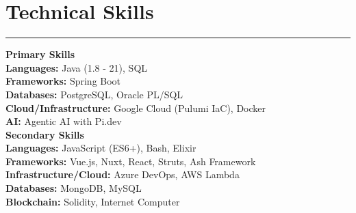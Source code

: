 \documentclass[11pt,a4paper]{article}
\begin{document}
\section*{Technical Skills}
\hrule
\vspace{5pt}
\textbf{Primary Skills} \\[6pt]
\textbf{Languages:} Java (1.8 - 21), SQL \\
\textbf{Frameworks:} Spring Boot \\
\textbf{Databases:} PostgreSQL, Oracle PL/SQL \\
\textbf{Cloud/Infrastructure:} Google Cloud (Pulumi IaC), Docker \\
\textbf{AI:} Agentic AI with Pi.dev \\[6pt]
\textbf{Secondary Skills} \\[6pt]
\textbf{Languages:} JavaScript (ES6+), Bash, Elixir \\
\textbf{Frameworks:} Vue.js, Nuxt, React, Struts, Ash Framework \\
\textbf{Infrastructure/Cloud:} Azure DevOps, AWS Lambda \\
\textbf{Databases:} MongoDB, MySQL \\
\textbf{Blockchain:} Solidity, Internet Computer
\end{document}
